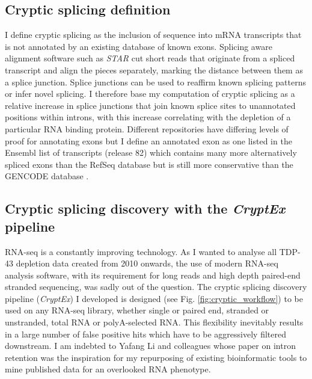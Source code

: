 \subsection{Cryptic splicing definition}
I define cryptic splicing as the inclusion of sequence into mRNA transcripts that is not annotated by an existing database of known exons. 
Splicing aware alignment software such as \emph{STAR} \citep{Dobin2013-ra} cut short reads that originate from a spliced transcript and align the pieces separately, marking the distance between them as a splice junction. Splice junctions can be used to reaffirm known splicing patterns or infer novel splicing. I therefore base my computation of cryptic splicing as a relative increase in splice junctions that join known splice sites to unannotated positions within introns, with this increase correlating with the depletion of a particular RNA binding protein. 
Different repositories have differing levels of proof for annotating exons but I define an annotated exon as one listed in the Ensembl list of transcripts (release 82) \citep{Cunningham2015} which contains many more alternatively spliced exons than the RefSeq database \citep{Pruitt2014} but is still more conservative than the GENCODE database \citep{Harrow2012}.

\subsection{Cryptic splicing discovery with the \emph{CryptEx} pipeline}

RNA-seq is a constantly improving technology. As I wanted to analyse all TDP-43 depletion data created from 2010 onwards, the use of modern RNA-seq analysis software, with its requirement for long reads and high depth paired-end stranded sequencing, was sadly out of the question. The cryptic splicing discovery pipeline (\textit{CryptEx}) I developed is designed (see Fig. \ref{fig:cryptic_workflow}) to be used on any RNA-seq library, whether single or paired end, stranded or unstranded, total RNA or polyA-selected RNA. This flexibility inevitably results in a large number of false positive hits which have to be aggressively filtered downstream. I am indebted to Yafang Li and colleagues whose paper on intron retention \citep{Li2015a} was the inspiration for my repurposing of existing bioinformatic tools to mine published data for an overlooked RNA phenotype.
 
